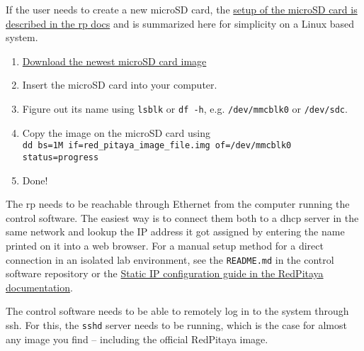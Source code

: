 If the user needs to create a new microSD card, the \href{https://redpitaya.readthedocs.io/en/latest/quickStart/SDcard/SDcard.html}{setup of the microSD card is described in the \acrshort{rp} docs} and is summarized here for simplicity on a Linux based system.

\begin{enumerate}
    \item \href{https://redpitaya.readthedocs.io/en/latest/quickStart/SDcard/SDcard.html}{Download the newest microSD card image}
    \item Insert the microSD card into your computer.
    \item Figure out its name using \lstinline{lsblk} or \lstinline{df -h}, e.g. \lstinline{/dev/mmcblk0} or \lstinline{/dev/sdc}.
    \item Copy the image on the microSD card using\\ \lstinline{dd bs=1M if=red_pitaya_image_file.img of=/dev/mmcblk0 status=progress}
    \item Done!
\end{enumerate}

The \acrshort{rp} needs to be reachable through Ethernet from the computer running the control software. The easiest way is to connect them both to a \acrshort{dhcp} server in the same network and lookup the IP address it got assigned by entering the name printed on it into a web browser. For a manual setup method for a direct connection in an isolated lab environment, see the \lstinline{README.md} in the control software repository or the \href{https://redpitaya.readthedocs.io/en/latest/quickStart/connect/connect.html#static-ip-configuration}{Static IP configuration guide in the RedPitaya documentation}.

The control software needs to be able to remotely log in to the system through \acrfull{ssh}. For this, the \lstinline{sshd} server needs to be running, which is the case for almost any image you find -- including the official RedPitaya image.

